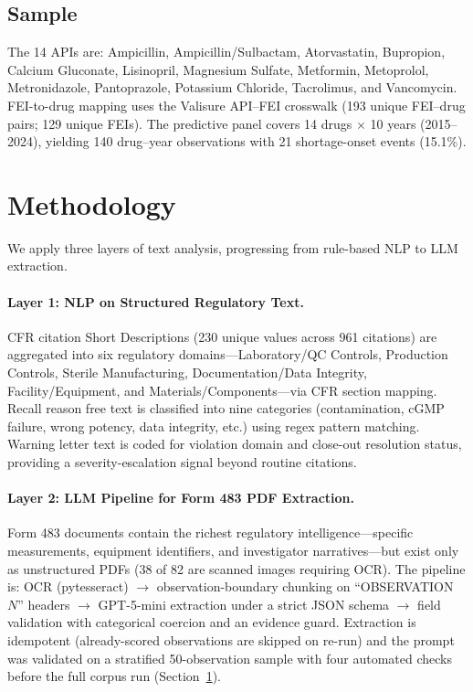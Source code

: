\documentclass[12pt]{article}
\begin{document}
\subsection{Sample}

The 14 APIs are: Ampicillin, Ampicillin/Sulbactam, Atorvastatin, Bupropion,
Calcium Gluconate, Lisinopril, Magnesium Sulfate, Metformin, Metoprolol,
Metronidazole, Pantoprazole, Potassium Chloride, Tacrolimus, and Vancomycin.
FEI-to-drug mapping uses the Valisure API--FEI crosswalk (193 unique FEI--drug
pairs; 129 unique FEIs).
The predictive panel covers 14 drugs $\times$ 10 years (2015--2024),
yielding 140 drug--year observations with 21 shortage-onset events (15.1\%).

\section{Methodology}
\label{sec:methods}

We apply three layers of text analysis, progressing from rule-based NLP to
LLM extraction.

\paragraph{Layer 1: NLP on Structured Regulatory Text.}
CFR citation Short Descriptions (230 unique values across 961 citations) are
aggregated into six regulatory domains---Laboratory/QC Controls, Production
Controls, Sterile Manufacturing, Documentation/Data Integrity,
Facility/Equipment, and Materials/Components---via CFR section mapping.
Recall reason free text is classified into nine categories (contamination,
cGMP failure, wrong potency, data integrity, etc.) using regex pattern matching.
Warning letter text is coded for violation domain and close-out resolution
status, providing a severity-escalation signal beyond routine citations.

\paragraph{Layer 2: LLM Pipeline for Form 483 PDF Extraction.}
Form 483 documents contain the richest regulatory intelligence---specific
measurements, equipment identifiers, and investigator narratives---but exist
only as unstructured PDFs (38 of 82 are scanned images requiring OCR).
The pipeline is: OCR (pytesseract) $\to$ observation-boundary chunking on
``OBSERVATION $N$'' headers $\to$ GPT-5-mini extraction under a strict JSON
schema $\to$ field validation with categorical coercion and an evidence guard.
Extraction is idempotent (already-scored observations are skipped on re-run)
and the prompt was validated on a stratified 50-observation sample with four
automated checks before the full corpus run (Section~\ref{sec:methods}).
\end{document}
